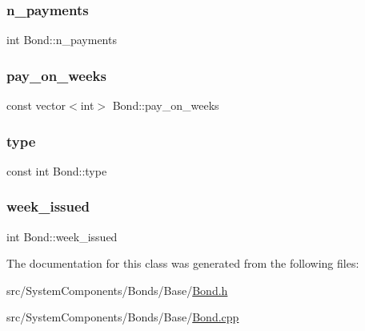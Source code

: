 \mbox{\label{classBond_a4a227b6de2eeada118d82ab1633b1db8}} 
\subsubsection{\texorpdfstring{n\+\_\+payments}{n\_payments}}
{\footnotesize\ttfamily int Bond\+::n\+\_\+payments\hspace{0.3cm}{\ttfamily [protected]}}

\mbox{\label{classBond_ae8dd46fcbf95c993460ffe4ea1f52739}} 
\subsubsection{\texorpdfstring{pay\+\_\+on\+\_\+weeks}{pay\_on\_weeks}}
{\footnotesize\ttfamily const vector$<$int$>$ Bond\+::pay\+\_\+on\+\_\+weeks}

\mbox{\label{classBond_a48da24878beedd71cbaa990cea860667}} 
\subsubsection{\texorpdfstring{type}{type}}
{\footnotesize\ttfamily const int Bond\+::type}

\mbox{\label{classBond_a30d48d158cbbd9c7b4bfa0012c89590a}} 
\subsubsection{\texorpdfstring{week\+\_\+issued}{week\_issued}}
{\footnotesize\ttfamily int Bond\+::week\+\_\+issued\hspace{0.3cm}{\ttfamily [protected]}}



The documentation for this class was generated from the following files\+:\begin{DoxyCompactItemize}
\item 
src/\+System\+Components/\+Bonds/\+Base/\mbox{\hyperlink{Bond_8h}{Bond.\+h}}\item 
src/\+System\+Components/\+Bonds/\+Base/\mbox{\hyperlink{Bond_8cpp}{Bond.\+cpp}}\end{DoxyCompactItemize}
